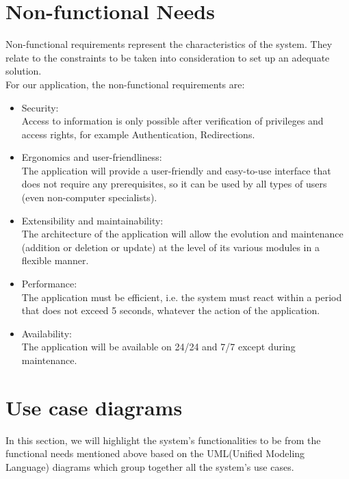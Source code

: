 \section{Non-functional Needs}
Non-functional requirements represent the characteristics of the system.
They relate to the constraints to be taken into consideration to set up
an adequate solution.\\
For our application, the non-functional requirements are:
\begin{itemize}
\item Security:\\
Access to information is only possible after verification of privileges and access rights,
for example Authentication, Redirections.

\item Ergonomics and user-friendliness:\\
The application will provide a user-friendly and easy-to-use interface that does not
require any prerequisites, so it can be used by all types of users (even non-computer specialists).

\item Extensibility and maintainability:\\
The architecture of the application will allow the evolution and maintenance (addition
or deletion or update) at the level of its various modules in a flexible manner.

\item Performance:\\
The application must be efficient, i.e. the system must react within a period that does
not exceed 5 seconds, whatever the action of the application.

\item Availability:\\
The application will be available on 24/24 and 7/7 except during maintenance.

\end{itemize}
\section{Use case diagrams}
In this section, we will highlight the system's functionalities to be
from the functional needs mentioned above based on the UML(Unified Modeling Language) diagrams which group together all the system's use cases.
